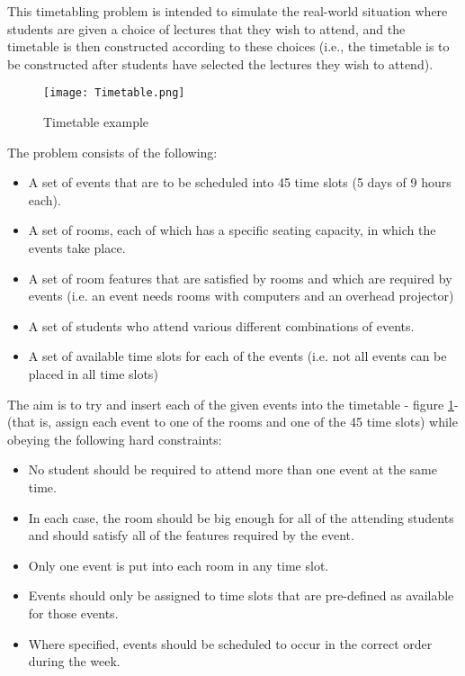 \documentclass{llncs}
\begin{document}
This timetabling problem is intended to simulate the real-world situation where
students are given a choice of lectures that they wish to attend, and the timetable is then
constructed according to these choices (i.e., the timetable is to be constructed after students
have selected the lectures they wish to attend).


\begin{figure}[ht]
\centering
\texttt{[image: Timetable.png]}
\caption{Timetable example}
\label{fig:ttb}
\end{figure}

The problem consists of the following:
\begin{itemize}
\item A set of events that are to be scheduled into 45 time slots (5 days of 9 hours each).
\item A set of rooms, each of which has a specific seating capacity, in which the events take
place.
\item A set of room features that are satisfied by rooms and which are required by events (i.e. an event
needs rooms with computers and an overhead projector)
\item A set of students who attend various different combinations of events.
\item A set of available time slots for each of the events (i.e. not all events can be placed in all
time slots)
\end{itemize}



The aim is to try and insert each of the given events into the timetable - figure \ref{fig:ttb}-  (that is, assign each event to one of the rooms and one of the 45 time slots) while obeying the following
hard constraints:


\begin{itemize}
\item No student should be required to attend more than one event at the same time.
\item In each case, the room should be big enough for all of the attending students and should
satisfy all of the features required by the event.
\item Only one event is put into each room in any time slot.
\item Events should only be assigned to time slots that are pre-defined as available for those
events.
\item Where specified, events should be scheduled to occur in the correct order during the week.
\end{itemize}
\end{document}
